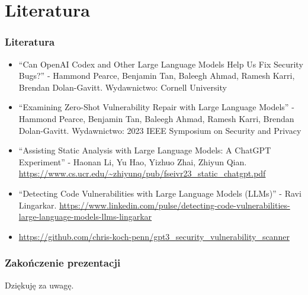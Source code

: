 \documentclass[lualatex,aspectratio=54,12pt,]{beamer}
\begin{document}
\section{Literatura}

\begin{frame}
      \frametitle{Literatura}
      \begin{itemize}
           \item ``Can OpenAI Codex and Other Large Language Models Help Us Fix Security Bugs?'' - Hammond Pearce, Benjamin Tan, Baleegh Ahmad, Ramesh Karri, Brendan Dolan-Gavitt. Wydawnictwo: Cornell University
           \item ``Examining Zero-Shot Vulnerability Repair with Large Language Models'' - Hammond Pearce, Benjamin Tan, Baleegh Ahmad, Ramesh Karri, Brendan Dolan-Gavitt. Wydawnictwo: 2023 IEEE Symposium on Security and Privacy
           \item ``Assisting Static Analysis with Large Language Models: A ChatGPT Experiment'' - Haonan Li, Yu Hao, Yizhuo Zhai, Zhiyun Qian. \url{https://www.cs.ucr.edu/~zhiyunq/pub/fseivr23_static_chatgpt.pdf}
           \item ``Detecting Code Vulnerabilities with Large Language Models (LLMs)'' - Ravi Lingarkar. \url{https://www.linkedin.com/pulse/detecting-code-vulnerabilities-large-language-models-llms-lingarkar}
           \item \url{https://github.com/chris-koch-penn/gpt3_security_vulnerability_scanner}
         \end{itemize}
\end{frame}


\begin{frame}
      \frametitle{Zakończenie prezentacji}
      \centering %
      \Huge %
      \textcolor{Logo}{Dziękuję za uwagę.} %
\end{frame}
\end{document}
